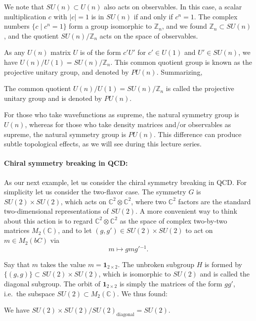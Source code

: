 \documentclass[12pt]{article}
\numberwithin{equation}{section}
\numberwithin{figure}{section}
\theoremstyle{remark}
\def\bC{\mathbb{C}}
\def\bZ{\mathbb{Z}}
\begin{document}
We note that $SU(n)\subset U(n)$ also acts on observables.
In this case, a scalar multiplication $c$ with $|c|=1$ is in $SU(n)$ if and only if $c^n=1$.
The complex numbers $\{c\mid c^n=1\}$ form a group isomorphic to $\bZ_n$,
and we found $\bZ_n \subset SU(n)$,
and the quotient $SU(n)/\bZ_n$ acts on the space of observables.

As any $U(n)$ matrix $U$ is of the form $c'U'$ for $c'\in U(1)$ and $U'\in SU(n)$,
we have $U(n)/U(1) = SU(n)/\bZ_n$.
This common quotient group is known as the projective unitary group, and denoted by $PU(n)$.
Summarizing, 
\begin{example}
The common quotient $U(n)/U(1)=SU(n)/\bZ_n$ is called the projective unitary group and is denoted by $PU(n)$.
\end{example}

For those who take wavefunctions as supreme, the natural symmetry group is $U(n)$,
whereas for those who take density matrices and/or observables as supreme,
the natural symmetry group is $PU(n)$.
This difference can produce subtle topological effects,
as we will see during this lecture series.

\paragraph{Chiral symmetry breaking in QCD:}
As our next example, 
let us consider the chiral symmetry breaking in QCD.
For simplicity let us consider the two-flavor case.
The symmetry $G$ is $SU(2)\times SU(2)$,
which acts on $\bC^2 \otimes \bC^2$,
where two $\bC^2$ factors are the standard two-dimensional representations of $SU(2)$.
A more convenient way to think about this action
is to regard $\bC^2\otimes \bC^2$ as the space of 
complex two-by-two matrices $M_2(\bC)$,
and to let $(g,g')\in SU(2)\times SU(2)$ to act on $m\in M_2(bC)$
via \begin{equation}
m\mapsto g m g'{}^{-1}.
\end{equation}

Say that $m$ takes the value $m=\mathbf{1}_{2\times 2}$.
The unbroken subgroup $H$ is formed by 
$\{(g,g)\}\subset SU(2)\times SU(2)$,
which is isomorphic to $SU(2)$ and is called the diagonal subgroup.
The orbit of $\mathbf{1}_{2\times 2}$ is simply 
the matrices of the form $gg'$,
i.e.~the subspace $SU(2)\subset M_2(\bC)$.
We thus found:
\begin{proposition}
We have $SU(2)\times SU(2)/SU(2)_\text{diagonal} = SU(2)$.
\end{proposition}
\end{document}
